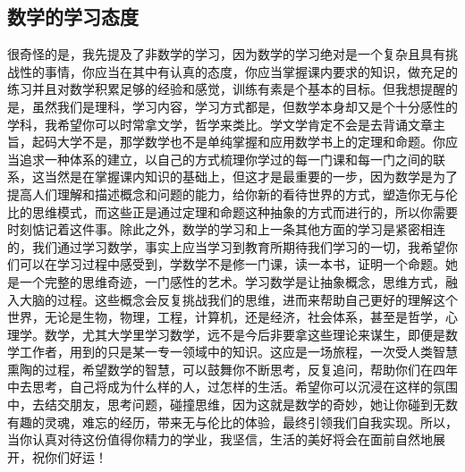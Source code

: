 \subsection{数学的学习态度}
很奇怪的是，我先提及了非数学的学习，因为数学的学习绝对是一个复杂且具有挑战性的事情，你应当在其中有认真的态度，你应当掌握课内要求的知识，做充足的练习并且对数学积累足够的经验和感觉，训练有素是个基本的目标。但我想提醒的是，虽然我们是理科，学习内容，学习方式都是，但数学本身却又是个十分感性的学科，我希望你可以时常拿文学，哲学来类比。学文学肯定不会是去背诵文章主旨，起码大学不是，那学数学也不是单纯掌握和应用数学书上的定理和命题。你应当追求一种体系的建立，以自己的方式梳理你学过的每一门课和每一门之间的联系，这当然是在掌握课内知识的基础上，但这才是最重要的一步，因为数学是为了提高人们理解和描述概念和问题的能力，给你新的看待世界的方式，塑造你无与伦比的思维模式，而这些正是通过定理和命题这种抽象的方式而进行的，所以你需要时刻惦记着这件事。除此之外，数学的学习和上一条其他方面的学习是紧密相连的，我们通过学习数学，事实上应当学习到教育所期待我们学习的一切，我希望你们可以在学习过程中感受到，学数学不是修一门课，读一本书，证明一个命题。她是一个完整的思维奇迹，一门感性的艺术。学习数学是让抽象概念，思维方式，融入大脑的过程。这些概念会反复挑战我们的思维，进而来帮助自己更好的理解这个世界，无论是生物，物理，工程，计算机，还是经济，社会体系，甚至是哲学，心理学。数学，尤其大学里学习数学，远不是今后非要拿这些理论来谋生，即便是数学工作者，用到的只是某一专一领域中的知识。这应是一场旅程，一次受人类智慧熏陶的过程，希望数学的智慧，可以鼓舞你不断思考，反复追问，帮助你们在四年中去思考，自己将成为什么样的人，过怎样的生活。希望你可以沉浸在这样的氛围中，去结交朋友，思考问题，碰撞思维，因为这就是数学的奇妙，她让你碰到无数有趣的灵魂，难忘的经历，带来无与伦比的体验，最终引领我们自我实现。所以，当你认真对待这份值得你精力的学业，我坚信，生活的美好将会在面前自然地展开，祝你们好运！


